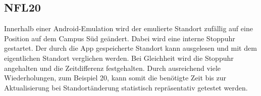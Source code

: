 \subsection*{NFL20}
Innerhalb einer Android-Emulation wird der emulierte Standort zufällig auf eine Position auf dem Campus Süd geändert.
Dabei wird eine interne Stoppuhr gestartet.
Der durch die App gespeicherte Standort kann ausgelesen und mit dem eigentlichen Standort verglichen werden.
Bei Gleichheit wird die Stoppuhr angehalten und die Zeitdifferenz festgehalten.
Durch ausreichend viele Wiederholungen, zum Beispiel 20, kann somit die benötigte Zeit bis zur Aktualisierung bei Standortänderung statistisch repräsentativ getestet werden.